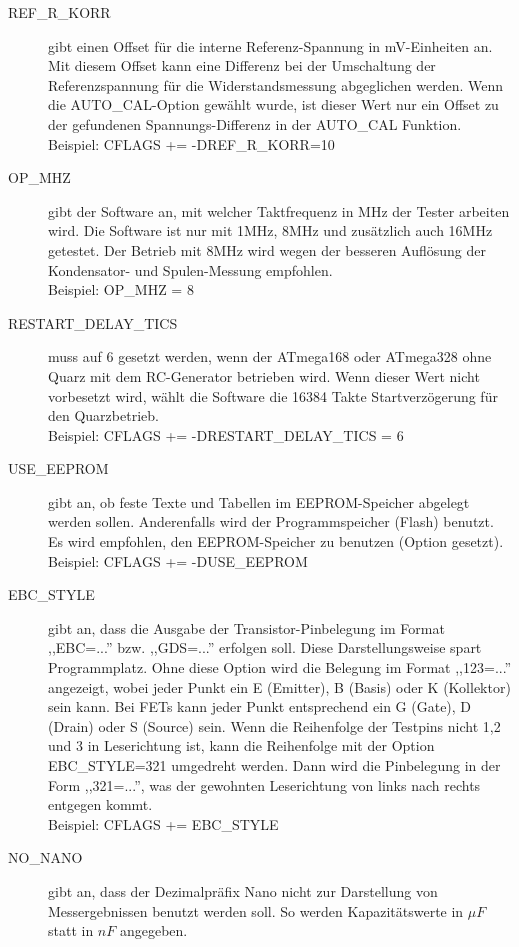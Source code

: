 \begin{description}
  \item[REF\_R\_KORR] gibt einen Offset für die interne Referenz-Spannung in mV-Einheiten an.
Mit diesem Offset kann eine Differenz bei der Umschaltung der Referenzspannung für die Widerstandsmessung abgeglichen werden.
Wenn die AUTO\_CAL-Option gewählt wurde, ist dieser Wert nur ein Offset zu der gefundenen Spannungs-Differenz in der
AUTO\_CAL Funktion.\\
Beispiel: CFLAGS += -DREF\_R\_KORR=10
  \item[OP\_MHZ] gibt der Software an, mit welcher Taktfrequenz in MHz der Tester arbeiten wird.
Die Software ist nur mit 1MHz, 8MHz und zusätzlich auch 16MHz getestet. Der Betrieb mit 8MHz wird wegen der besseren Auflösung der
Kondensator- und Spulen-Messung empfohlen.\\
Beispiel: OP\_MHZ = 8
  \item[RESTART\_DELAY\_TICS] muss auf 6 gesetzt werden, wenn der ATmega168 oder ATmega328 ohne Quarz mit dem
RC-Generator betrieben wird. Wenn dieser Wert nicht vorbesetzt wird, wählt die Software die 16384 Takte Startverzögerung für
den Quarzbetrieb.\\
Beispiel: CFLAGS += -DRESTART\_DELAY\_TICS = 6
  \item[USE\_EEPROM] gibt an, ob feste Texte und Tabellen im EEPROM-Speicher abgelegt werden sollen.
Anderenfalls wird der Programmspeicher (Flash) benutzt.
Es wird empfohlen, den EEPROM-Speicher zu benutzen (Option gesetzt).\\
Beispiel: CFLAGS += -DUSE\_EEPROM
  \item[EBC\_STYLE] gibt an, dass die Ausgabe der Transistor-Pinbelegung im Format ,,EBC=...'' bzw. ,,GDS=...'' erfolgen soll.
Diese Darstellungsweise spart Programmplatz. Ohne diese Option wird die Belegung im Format ,,123=...'' angezeigt, wobei
jeder Punkt ein E (Emitter), B (Basis) oder K (Kollektor) sein kann.
Bei FETs kann jeder Punkt entsprechend ein G (Gate), D (Drain) oder S (Source) sein.
Wenn die Reihenfolge der Testpins nicht 1,2 und 3 in Leserichtung ist, kann die Reihenfolge mit der Option EBC\_STYLE=321 
umgedreht werden. Dann wird die Pinbelegung in der Form ,,321=...'', was der gewohnten Leserichtung von links nach rechts
entgegen kommt.\\
Beispiel: CFLAGS += EBC\_STYLE
  \item[NO\_NANO] gibt an, dass der Dezimalpräfix Nano nicht zur Darstellung von Messergebnissen benutzt werden soll.
So werden Kapazitätswerte in \(\mu F\) statt in \(nF\) angegeben.\\

\end{description}

